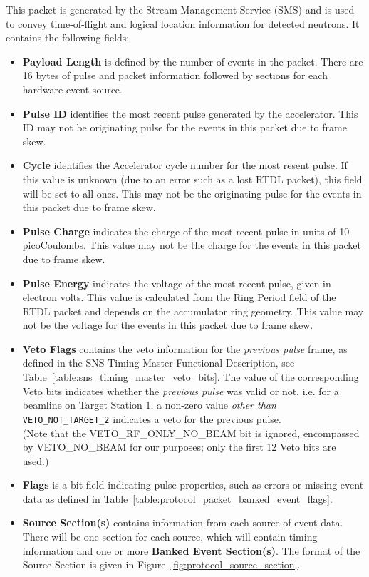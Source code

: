 This packet is generated by the
Stream Management Service (SMS) and is used to convey time-of-flight and
logical location information for detected neutrons.
It contains the following fields:
\begin{itemize}
\item{\bf Payload Length} is defined by the number of events in the packet.
There are 16 bytes of pulse and packet information followed by sections for
each hardware event source.
\item{\bf Pulse ID} identifies the most recent pulse generated by the
accelerator. This ID may not be originating pulse for the events in this packet
due to frame skew.
\item{\bf Cycle} identifies the Accelerator cycle number for the most
resent pulse. If this value is unknown (due to an error such as a lost RTDL
packet), this field will be set to all ones. This may not be the originating
pulse for the events in this packet due to frame skew.
\item{\bf Pulse Charge} indicates the charge of the most recent pulse in units
of 10 picoCoulombs. This value may not be the charge for the events in this
packet due to frame skew.
\item{\bf Pulse Energy} indicates the voltage of the most recent pulse,
given in electron volts. This value is calculated from the Ring Period
field of the RTDL packet and depends on the accumulator ring geometry. This
value may not be the voltage for the events in this packet due to frame skew.
\item{\bf Veto Flags} contains the veto information
for the {\it previous pulse} frame,
as defined in the SNS Timing Master Functional Description,
see Table~\ref{table:sns_timing_master_veto_bits}.
The value of the corresponding Veto bits indicates whether the
{\it previous pulse} was valid or not,
i.e. for a beamline on Target Station 1,
a non-zero value {\it other than } {\tt VETO\_NOT\_TARGET\_2}
indicates a veto for the previous pulse. \\
(Note that the VETO\_RF\_ONLY\_NO\_BEAM bit is ignored,
encompassed by VETO\_NO\_BEAM for our purposes;
only the first 12 Veto bits are used.)
\item{\bf Flags} is a bit-field indicating pulse properties, such as errors or
missing event data as defined in
Table~\ref{table:protocol_packet_banked_event_flags}.
\item{\bf Source Section(s)} contains information from each source of event
data. There will be one section for each source, which will contain timing
information and one or more {\bf Banked Event Section(s)}. The format of the
Source Section is given in Figure~\ref{fig:protocol_source_section}.
\end{itemize}


